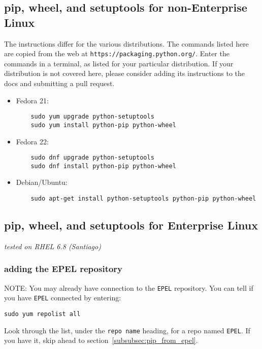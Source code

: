 \subsection{pip, wheel, and setuptools for non-Enterprise Linux}
\label{subsec:setup_non-enterprise}

The instructions differ for the various distributions.
The commands listed here are copied 
from the web at \verb|https://packaging.python.org/|.
Enter the commands in a terminal, 
as listed for your particular distribution.
If your distribution is not covered here, 
please consider adding its instructions to the docs
and submitting a pull request.

\begin{itemize}
\item Fedora 21: 
    \begin{lstlisting}
    sudo yum upgrade python-setuptools
    sudo yum install python-pip python-wheel
    \end{lstlisting}
\item Fedora 22: 
    \begin{lstlisting}
    sudo dnf upgrade python-setuptools
    sudo dnf install python-pip python-wheel
    \end{lstlisting}
\item Debian/Ubuntu: 
    \begin{lstlisting}
    sudo apt-get install python-setuptools python-pip python-wheel
    \end{lstlisting}
\end{itemize}


\subsection{pip, wheel, and setuptools for Enterprise Linux}
\label{subsec:setup_rhel}

\textit{tested on RHEL 6.8 (Santiago)}

\subsubsection{adding the EPEL repository}

NOTE: You may already have connection to the \verb|EPEL| repository.
You can tell if you have \verb|EPEL| connected by entering:
\begin{lstlisting}
sudo yum repolist all
\end{lstlisting}
Look through the list, 
under the \verb|repo name| heading,
for a repo named \verb|EPEL|.
If you have it, skip ahead to section~\ref{subsubsec:pip_from_epel}.


